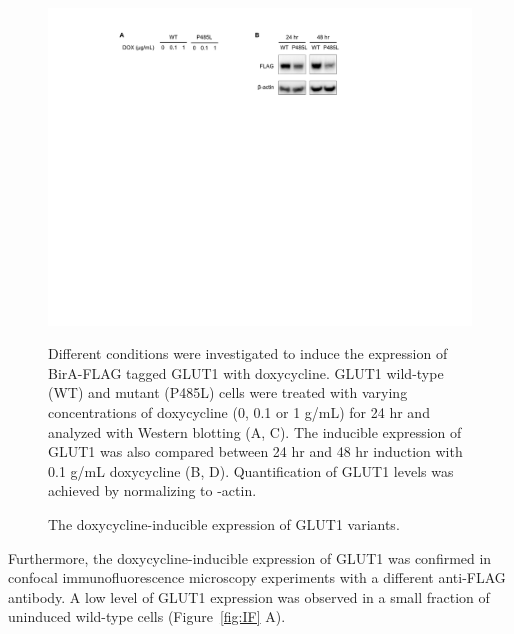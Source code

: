 \begin{figure}[h]
\centering
\includegraphics[scale=0.7]{Figures/WB}
\caption{The doxycycline-inducible expression of GLUT1 variants.}
\vspace*{-3mm}
\small \justify
Different conditions were investigated to induce the expression of BirA-FLAG tagged GLUT1 with doxycycline. GLUT1 wild-type (WT) and mutant (P485L) cells were treated with varying concentrations of doxycycline (0, 0.1 or 1 \textmu g/mL) for 24 hr and analyzed with Western blotting (A, C). The inducible expression of GLUT1 was also compared between 24 hr and 48 hr induction with 0.1 \textmu g/mL doxycycline (B, D). Quantification of GLUT1 levels was achieved by normalizing to \textbeta -actin.
\label{fig:wb}
\end{figure}
Furthermore, the doxycycline-inducible expression of GLUT1 was confirmed in confocal immunofluorescence microscopy experiments with a different anti-FLAG antibody. A low level of GLUT1 expression was observed in a small fraction of uninduced wild-type cells (Figure~\ref{fig:IF} A).
